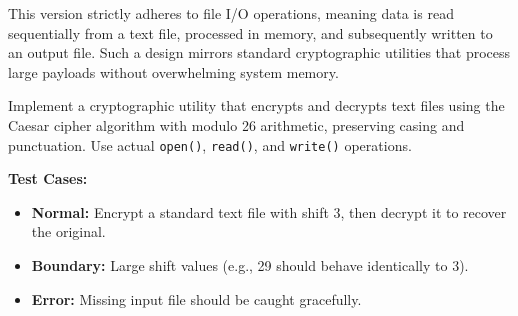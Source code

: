 This version strictly adheres to file I/O operations, meaning data is read sequentially from a text file, processed in memory, and subsequently written to an output file. Such a design mirrors standard cryptographic utilities that process large payloads without overwhelming system memory.

\begin{practiceset}
Implement a cryptographic utility that encrypts and decrypts text files using the Caesar cipher algorithm with modulo 26 arithmetic, preserving casing and punctuation. Use actual \texttt{open()}, \texttt{read()}, and \texttt{write()} operations.

\textbf{Test Cases:}
\begin{itemize}
    \item \textbf{Normal:} Encrypt a standard text file with shift 3, then decrypt it to recover the original.
    \item \textbf{Boundary:} Large shift values (e.g., 29 should behave identically to 3).
    \item \textbf{Error:} Missing input file should be caught gracefully.
\end{itemize}
\end{practiceset}

